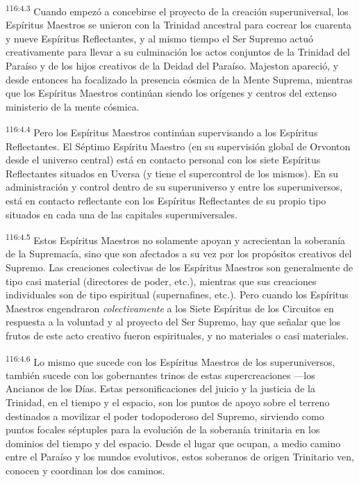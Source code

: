\par
\textsuperscript{116:4.3} Cuando empezó a concebirse el proyecto de la creación superuniversal, los Espíritus Maestros se unieron con la Trinidad ancestral para cocrear los cuarenta y nueve Espíritus Reflectantes, y al mismo tiempo el Ser Supremo actuó creativamente para llevar a su culminación los actos conjuntos de la Trinidad del Paraíso y de los hijos creativos de la Deidad del Paraíso. Majeston apareció, y desde entonces ha focalizado la presencia cósmica de la Mente Suprema, mientras que los Espíritus Maestros continúan siendo los orígenes y centros del extenso ministerio de la mente cósmica.

\par
\textsuperscript{116:4.4} Pero los Espíritus Maestros continúan supervisando a los Espíritus Reflectantes. El Séptimo Espíritu Maestro (en su supervisión global de Orvonton desde el universo central) está en contacto personal con los siete Espíritus Reflectantes situados en Uversa (y tiene el supercontrol de los mismos). En su administración y control dentro de su superuniverso y entre los superuniversos, está en contacto reflectante con los Espíritus Reflectantes de su propio tipo situados en cada una de las capitales superuniversales.

\par
\textsuperscript{116:4.5} Estos Espíritus Maestros no solamente apoyan y acrecientan la soberanía de la Supremacía, sino que son afectados a su vez por los propósitos creativos del Supremo. Las creaciones colectivas de los Espíritus Maestros son generalmente de tipo casi material (directores de poder, etc.), mientras que sus creaciones individuales son de tipo espiritual (supernafines, etc.). Pero cuando los Espíritus Maestros engendraron \textit{colectivamente} a los Siete Espíritus de los Circuitos en respuesta a la voluntad y al proyecto del Ser Supremo, hay que señalar que los frutos de este acto creativo fueron espirituales, y no materiales o casi materiales.

\par
\textsuperscript{116:4.6} Lo mismo que sucede con los Espíritus Maestros de los superuniversos, también sucede con los gobernantes trinos de estas supercreaciones ---los Ancianos de los Días. Estas personificaciones del juicio y la justicia de la Trinidad, en el tiempo y el espacio, son los puntos de apoyo sobre el terreno destinados a movilizar el poder todopoderoso del Supremo, sirviendo como puntos focales séptuples para la evolución de la soberanía trinitaria en los dominios del tiempo y del espacio. Desde el lugar que ocupan, a medio camino entre el Paraíso y los mundos evolutivos, estos soberanos de origen Trinitario ven, conocen y coordinan los dos caminos.

